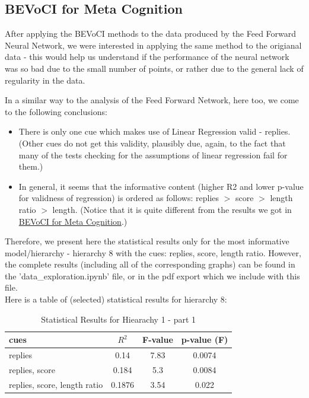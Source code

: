 \documentclass[11pt, oneside]{article}   	%
\begin{document}
\subsection{BEVoCI for Meta Cognition}\label{sec:mc_hlr}
After applying the BEVoCI methods to the data produced by the Feed Forward Neural Network, we were interested in applying the same method to the origianal data - this would help us understand if the performance of the neural network was so bad due to the small number of points, or rather due to the general lack of regularity in the data.

In a similar way to the analysis of the Feed Forward Network, here too, we come to the following conclusions:
\begin{itemize}
    \item There is only one cue which makes use of Linear Regression valid - replies. (Other cues do not get this validity, plausibly due, again, to the fact that many of the tests checking for the assumptions of linear regression fail for them.)
    \item In general, it seems that the informative content (higher R2 and lower p-value for validness of regression) is ordered as follows: replies $>$ score $>$ length ratio $>$ length. (Notice that it is quite different from the results we got in \href{sec:ffn_hlr}{BEVoCI for Meta Cognition}.)
\end{itemize}

Therefore, we present here the statistical results only for the most informative model/hierarchy - hierarchy 8 with the cues: replies, score, length ratio. However, the complete results (including all of the corresponding graphs) can be found in the 'data\_exploration.ipynb' file, or in the pdf export which we include with this file.\\

Here is a table of (selected) statistical results for hierarchy 8:
\begin{table}[H]
  \begin{center}
  \begin{tabular}{|l|c|c|c|}
    \hline
    cues & $R^2$ & F-value & p-value (F) \\
    \hline
    replies & 0.14 & 7.83 & 0.0074 \\
    replies, score & 0.184 & 5.3 & 0.0084  \\
    replies, score, length ratio & 0.1876 & 3.54 & 0.022  \\
    \hline
  \end{tabular}
  \caption{Statistical Results for Hiearachy 1 - part 1}
  \end{center}
\end{table}
\end{document}
